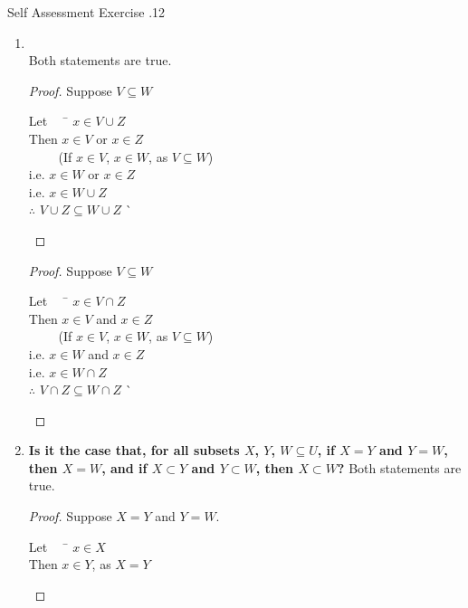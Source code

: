 \documentclass[../notes.tex]{subfiles}
\begin{document}
			\begin{exercise}{Self Assessment Exercise \thechapter.12}
				\begin{enumerate}
					\item {}\\
						Both statements are true.
						\begin{proof}
							Suppose $V \subseteq W$
							\begin{tabbing}
								Let $\quad$ \= $x \in V \cup Z$\\
								Then \> $x \in V$ or $x \in Z$\\
								\> $\qquad$ (If $x \in V$, $x \in W$, as $V \subseteq W$)\\
								i.e. \> $x \in W$ or $x \in Z$\\
								i.e. \> $x \in W \cup Z$\\
								$\therefore$ \> $V \cup Z \subseteq W \cup Z$ \`\qedhere
							\end{tabbing}
						\end{proof}
						\begin{proof}
							Suppose $V \subseteq W$ 
							\begin{tabbing}
								Let $\quad$ \= $x \in V \cap Z$\\
								Then \> $x \in V$ and $x \in Z$\\
								\> $\qquad$ (If $x \in V$, $x \in W$, as $V \subseteq W$)\\
								i.e. \> $x \in W$ and $x \in Z$\\
								i.e. \> $x \in W \cap Z$\\
								$\therefore$ \> $V \cap Z \subseteq W \cap Z$ \`\qedhere
							\end{tabbing}
						\end{proof}
					\item \textbf{Is it the case that, for all subsets $X$, $Y$, $W \subseteq U$, if $X = Y$ and $Y = W$, then $X = W$, and if $X \subset Y$ and $Y \subset W$, then $X \subset W$?}\questionspace
						Both statements are true.
						\begin{proof}
							Suppose $X = Y$ and $Y = W$.
							\begin{tabbing}
								Let $\quad$ \= $x \in X$\\
								Then \> $x \in Y$, as $X = Y$\\

\end{tabbing}
\end{proof}
\end{enumerate}
\end{exercise}
\end{document}
